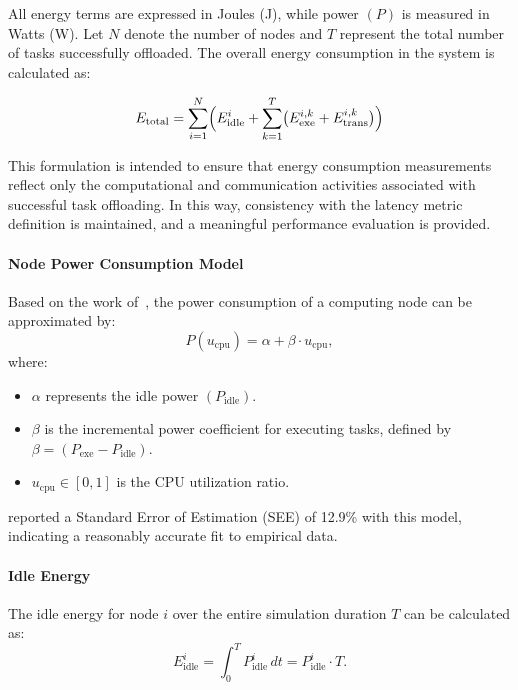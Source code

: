 \documentclass{svproc}
\begin{document}
All energy terms are expressed in Joules (J), while power $(P)$ is measured in Watts (W). Let $N$ denote the number of nodes and $T$ represent the total number of tasks successfully offloaded. The overall energy consumption in the system is calculated as:

\begin{equation}
E_{\text{total}} = 
    \sum_{i=1}^{N}
    \Bigl( E_{\text{idle}}^{i} + \sum_{k=1}^{T} 
    \bigl(E_{\text{exe}}^{i,k} + E_{\text{trans}}^{i,k}\bigr) \Bigr)
\end{equation}

This formulation is intended to ensure that energy consumption measurements reflect only the computational and communication activities associated with successful task offloading. In this way, consistency with the latency metric definition is maintained, and a meaningful performance evaluation is provided.

\paragraph{Node Power Consumption Model}
Based on the work of~, the power consumption of a computing node can be approximated by:
\begin{equation}
P(u_{\text{cpu}}) = \alpha + \beta \cdot u_{\text{cpu}},
\end{equation}
where:
\begin{itemize}
    \item \(\alpha\) represents the idle power \((P_{\text{idle}})\).
    \item \(\beta\) is the incremental power coefficient for executing tasks, defined by \(\beta = (P_{\text{exe}} - P_{\text{idle}})\).
    \item \(u_{\text{cpu}} \in [0,1]\) is the CPU utilization ratio.
\end{itemize}

\cite{ismail_computing_2021} reported a Standard Error of Estimation (SEE) of 12.9\% with this model, indicating a reasonably accurate fit to empirical data.

\paragraph{Idle Energy}
The idle energy for node \(i\) over the entire simulation duration \(T\) can be calculated as:
\begin{equation}
E_{\text{idle}}^{i} = \int_{0}^{T} P_{\text{idle}}^{i} \, dt = P_{\text{idle}}^{i} \cdot T.
\end{equation}
\end{document}
